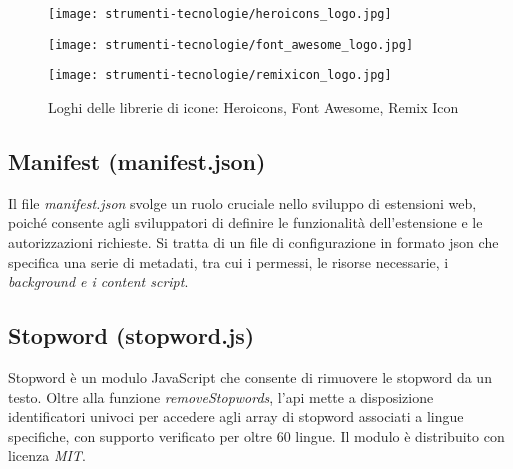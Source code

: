 \vspace{5pt}
\begin{figure}[H]
  \centering
  \begin{minipage}{0.3\columnwidth}
    \centering
    \texttt{[image: strumenti-tecnologie/heroicons\_logo.jpg]} 
  \end{minipage}
  \hfill
  \begin{minipage}{0.3\columnwidth}
    \centering
    \texttt{[image: strumenti-tecnologie/font\_awesome\_logo.jpg]} 
  \end{minipage}
  \hfill
  \begin{minipage}{0.3\columnwidth}
    \centering
    \texttt{[image: strumenti-tecnologie/remixicon\_logo.jpg]} 
  \end{minipage}
  \caption{Loghi delle librerie di icone: Heroicons, Font Awesome, Remix Icon}
  \label{fig:loghi_librerie_icone}
\end{figure}
\vspace{5pt}

\subsection*{Manifest (manifest.json)}

Il file \textit{manifest.json} svolge un ruolo cruciale nello sviluppo di estensioni web, poiché consente agli sviluppatori di definire le funzionalità dell’estensione e le autorizzazioni richieste. Si tratta di un file di configurazione in formato \gls{json} che specifica una serie di metadati, tra cui i permessi, le risorse necessarie, i \textit{background e i content script}.

\subsection*{Stopword (stopword.js)}

Stopword è un modulo JavaScript che consente di rimuovere le \gls{stopword} da un testo. Oltre alla funzione \textit{removeStopwords}, l’\gls{api} mette a disposizione identificatori univoci per accedere agli array di \gls{stopword} associati a lingue specifiche, con supporto verificato per oltre 60 lingue. Il modulo è distribuito con licenza \textit{MIT}.